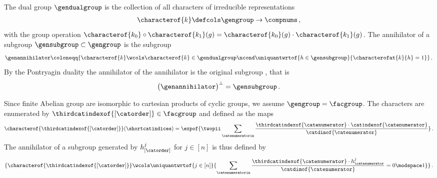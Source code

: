 The dual group $\gendualgroup$ is the collection of all characters of irreducible representations
\begin{align*}
    \characterof{k} \defcols \gengroup \rightarrow \compnums \, ,
\end{align*}
with the group operation $\characterof{k_0}\circ \characterof{k_1} (g) = \characterof{k_0}(g)\cdot\characterof{k_1}(g)$.
The annihilator of a subgroup $\gensubgroup\subset \gengroup$ is the subgroup
\begin{align*}
    \genannihilator\coloneqq
    \{\characterof{k} \wcols \characterof{k}\in\gendualgroup\ncond \uniquantwrtof{h\in \gensubgroup}{\characterofat{k}{h}=1} \} \, .
\end{align*}
By the Pontryagin duality the annihilator of the annihilator is the original subgroup \cite{serre_linear_1977, terras_fourier_1999}, that is
\begin{align*}
    \big(\genannihilator\big)^{\perp}
    = \gensubgroup \, .
\end{align*}

Since finite Abelian group are isomorphic to cartesian products of cyclic groups, we assume $\gengroup=\facgroup$.
The characters are enumerated by $\thirdcatindexof{[\catorder]}\in\facgroup$ and defined as the maps
\begin{align*}
    \characterof{\thirdcatindexof{[\catorder]}}(\shortcatindices)
    = \expof{\twopii \sum_{\catenumeratorin} \frac{\thirdcatindexof{\catenumerator}\cdot\catindexof{\catenumerator}}{\catdimof{\catenumerator}}} \, .
\end{align*}
The annihilator of a subgroup generated by $h^j_{[\catorder]}$ for $j\in[n]$ is thus defined by
\begin{align*}
    \{\characterof{\thirdcatindexof{[\catorder]}} \wcols
    \uniquantwrtof{j\in[n]}{
        \sum_{\catenumeratorin} \frac{\thirdcatindexof{\catenumerator}\cdot h^j_{\catenumerator}}{\catdimof{\catenumerator}} = 0 \modspace 1
    }\} \, .
\end{align*}


